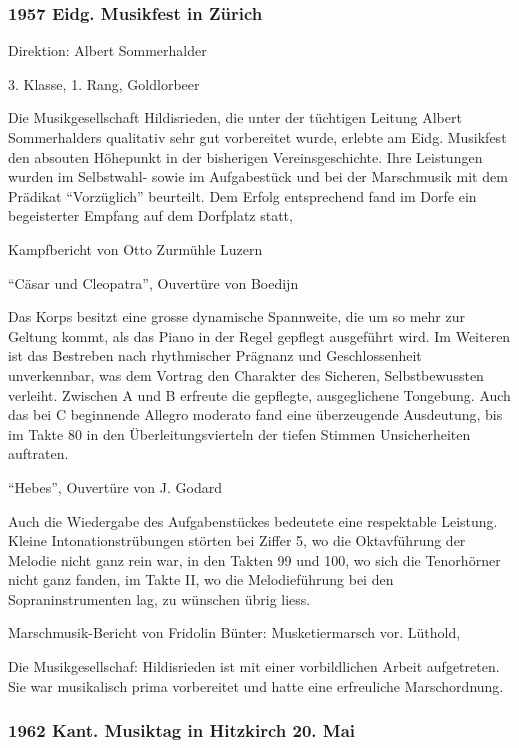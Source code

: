 \begin{history}
    \subsubsection{1957 Eidg. Musikfest in Zürich}

    Direktion: Albert Sommerhalder

    3. Klasse, 1. Rang, Goldlorbeer

    Die Musikgesellschaft Hildisrieden, die unter der tüchtigen Leitung Albert
    Sommerhalders qualitativ sehr gut vorbereitet wurde, erlebte am Eidg.
    Musikfest den absouten Höhepunkt in der bisherigen Vereinsgeschichte. Ihre
    Leistungen wurden im Selbstwahl- sowie im Aufgabestück und bei der
    Marschmusik mit dem Prädikat \enquote{Vorzüglich} beurteilt. Dem Erfolg
    entsprechend fand im Dorfe ein begeisterter Empfang auf dem Dorfplatz statt,

    Kampfbericht von Otto Zurmühle Luzern

    \enquote{Cäsar und Cleopatra}, Ouvertüre von Boedijn

    Das Korps besitzt eine grosse dynamische Spannweite, die um so mehr zur
    Geltung kommt, als das Piano in der Regel gepflegt ausgeführt wird. Im
    Weiteren ist das Bestreben nach rhythmischer Prägnanz und Geschlossenheit
    unverkennbar, was dem Vortrag den Charakter des Sicheren, Selbstbewussten
    verleiht. Zwischen A und B erfreute die gepflegte, ausgeglichene Tongebung.
    Auch das bei C beginnende Allegro moderato fand eine überzeugende
    Ausdeutung, bis im Takte 80 in den Überleitungsvierteln der tiefen Stimmen
    Unsicherheiten auftraten.

    \enquote{Hebes}, Ouvertüre von J. Godard

    Auch die Wiedergabe des Aufgabenstückes bedeutete eine respektable Leistung.
    Kleine Intonationstrübungen störten bei Ziffer 5, wo die Oktavführung der
    Melodie nicht ganz rein war, in den Takten 99 und 100, wo sich die
    Tenorhörner nicht ganz fanden, im Takte II, wo die Melodieführung bei den
    Sopraninstrumenten lag, zu wünschen übrig liess.

    Marschmusik-Bericht von Fridolin Bünter: Musketiermarsch vor. Lüthold,

    Die Musikgesellschaf: Hildisrieden ist mit einer vorbildlichen Arbeit
    aufgetreten. Sie war musikalisch prima vorbereitet und hatte eine
    erfreuliche Marschordnung.

    \subsubsection{    1962 Kant. Musiktag in Hitzkirch 20. Mai}


\end{history}
